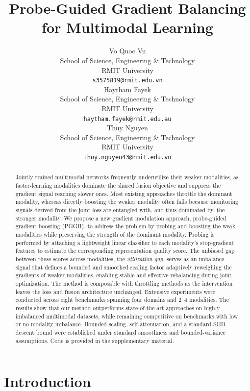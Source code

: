 \documentclass{article} %
\title{Probe-Guided Gradient Balancing \\ for Multimodal Learning}
\author{%
  Vo Quoc Vu \\
  School of Science, Engineering \& Technology \\
  RMIT University \\
  \texttt{s3575819@rmit.edu.vn} \\
  \And
  Haytham Fayek \\
  School of Science, Engineering \& Technology \\
  RMIT University \\
  \texttt{haytham.fayek@rmit.edu.au} \\
  \And
  Thuy Nguyen \\
  School of Science, Engineering \& Technology \\
  RMIT University \\
  \texttt{thuy.nguyen43@rmit.edu.vn} \\
}
\begin{document}
\maketitle


\begin{abstract}

Jointly trained multimodal networks frequently underutilize their weaker modalities, as faster-learning modalities dominate the shared fusion objective and suppress the gradient signal reaching slower ones. Most existing approaches throttle the dominant modality, whereas directly boosting the weaker modality often fails because monitoring signals derived from the joint loss are entangled with, and thus dominated by, the stronger modality.
We propose a new gradient modulation approach, probe-guided gradient boosting (PGGB), to address the problem by probing and boosting the weak modalities while preserving the strength of the dominant modality. 
Probing is performed by attaching a lightweight linear classifier to each modality’s stop-gradient features to estimate the corresponding representation quality score. The unbiased gap between these scores across modalities, the \emph{utilization gap}, serves as an imbalance signal that defines a bounded and smoothed scaling factor adaptively reweighing the gradients of weaker modalities, enabling stable and effective rebalancing during joint optimization.
The method is composable with throttling methods as the intervention leaves the loss and fusion architecture unchanged. 
Extensive experiments were conducted across eight benchmarks spanning four domains and 2–4 modalities. The results show that our method outperforms state-of-the-art approaches on highly imbalanced multimodal datasets, while remaining competitive on benchmarks with low or no modality imbalance.
Bounded scaling, self-attenuation, and a standard-SGD descent bound were established under standard smoothness and bounded-variance assumptions. 
Code is provided in the supplementary material.
\end{abstract}

\section{Introduction}
\label{sec:intro}

\end{document}
